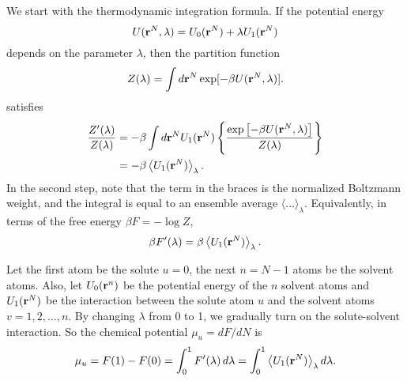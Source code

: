 \documentclass[12pt]{article}
\begin{document}
We start with the thermodynamic integration formula.
If the potential energy
\begin{equation}
  U(\mathbf{r}^N, \lambda) = U_0(\mathbf{r}^N) + \lambda U_1(\mathbf{r}^N)
  \label{eq:potene}
\end{equation}
depends on the parameter $\lambda$,
then the partition function
%
\begin{equation}
  Z(\lambda) = \int d\mathbf{r}^N \exp[-\beta U(\mathbf{r}^N, \lambda)].
  \label{eq:partfunc}
\end{equation}
%
satisfies
\begin{align}
  \frac{ Z'(\lambda) }{Z(\lambda)}
  &=
    -\beta \int d\mathbf{r}^N U_1(\mathbf{r}^N)
    \left\{
      \frac{ \exp
             \left[
             -\beta U(\mathbf{r}^N, \lambda)
             \right]}
      { Z(\lambda) }
    \right\} \notag \\
  &=
    -\beta
    \left\langle
      U_1(\mathbf{r}^N)
    \right\rangle_\lambda.
\end{align}
In the second step, note that the term in the braces
  is the normalized Boltzmann weight,
  and the integral is equal to an ensemble average
  $\langle \dots \rangle_\lambda$.
%
Equivalently, in terms of the free energy $\beta F = -\log Z$,
\begin{equation}
  \beta F'(\lambda)
  = \beta
    \left\langle
      U_1(\mathbf{r}^N)
    \right\rangle_\lambda.
\end{equation}

Let the first atom be the solute $u = 0$,
  the next $n = N - 1$ atoms be the solvent atoms.
Also,
  let $U_0(\mathbf{r}^n)$ be the potential energy of the $n$ solvent atoms
  and $U_1(\mathbf{r}^N)$ be the interaction between the solute atom $u$
  and the solvent atoms $v = 1, 2, \dots, n$.
By changing $\lambda$ from 0 to 1, we gradually turn on
  the solute-solvent interaction.
%
So the chemical potential $\mu_u = dF/dN$ is
\begin{align}
  \mu_u
  =
  F(1) - F(0)
  =
  \int_0^1 F'(\lambda) \, d\lambda
  =
  \int_0^1
    \left\langle
      U_1(\mathbf{r}^N)
    \right\rangle_\lambda d\lambda.
  \label{eq:muti0}
\end{align}
\end{document}
